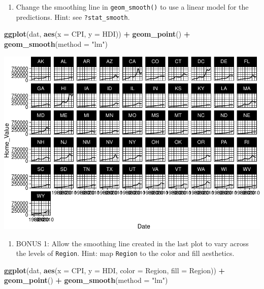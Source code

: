 \documentclass[
]{book}
\newenvironment{Shaded}{\begin{snugshade}}{\end{snugshade}}
\newcommand{\DataTypeTok}[1]{\textcolor[rgb]{0.13,0.29,0.53}{#1}}
\newcommand{\KeywordTok}[1]{\textcolor[rgb]{0.13,0.29,0.53}{\textbf{#1}}}
\newcommand{\NormalTok}[1]{#1}
\newcommand{\OperatorTok}[1]{\textcolor[rgb]{0.81,0.36,0.00}{\textbf{#1}}}
\newcommand{\StringTok}[1]{\textcolor[rgb]{0.31,0.60,0.02}{#1}}
\providecommand{\tightlist}{%
  \setlength{\itemsep}{0pt}\setlength{\parskip}{0pt}}
\begin{document}
\begin{alert}
\begin{enumerate}
\def\labelenumi{\arabic{enumi}.}
\setcounter{enumi}{3}
\tightlist
\item
  Change the smoothing line in \texttt{geom\_smooth()} to use a linear model for the predictions. Hint: see \texttt{?stat\_smooth}.
\end{enumerate}

\begin{Shaded}
\begin{Highlighting}[]
\KeywordTok{ggplot}\NormalTok{(dat, }\KeywordTok{aes}\NormalTok{(}\DataTypeTok{x =}\NormalTok{ CPI, }\DataTypeTok{y =}\NormalTok{ HDI)) }\OperatorTok{+}
\StringTok{  }\KeywordTok{geom\_point}\NormalTok{() }\OperatorTok{+}
\StringTok{  }\KeywordTok{geom\_smooth}\NormalTok{(}\DataTypeTok{method =} \StringTok{"lm"}\NormalTok{)}
\end{Highlighting}
\end{Shaded}

\includegraphics{R/Rgraphics/figures/unnamed-chunk-179-1.pdf}

\begin{enumerate}
\def\labelenumi{\arabic{enumi}.}
\setcounter{enumi}{4}
\tightlist
\item
  BONUS 1: Allow the smoothing line created in the last plot to vary across the levels of \texttt{Region}. Hint: map \texttt{Region} to the color and fill aesthetics.
\end{enumerate}

\begin{Shaded}
\begin{Highlighting}[]
\KeywordTok{ggplot}\NormalTok{(dat, }\KeywordTok{aes}\NormalTok{(}\DataTypeTok{x =}\NormalTok{ CPI, }\DataTypeTok{y =}\NormalTok{ HDI, }\DataTypeTok{color =}\NormalTok{ Region, }\DataTypeTok{fill =}\NormalTok{ Region)) }\OperatorTok{+}
\StringTok{  }\KeywordTok{geom\_point}\NormalTok{() }\OperatorTok{+}
\StringTok{  }\KeywordTok{geom\_smooth}\NormalTok{(}\DataTypeTok{method =} \StringTok{"lm"}\NormalTok{)}
\end{Highlighting}
\end{Shaded}


\end{alert}
\end{document}

